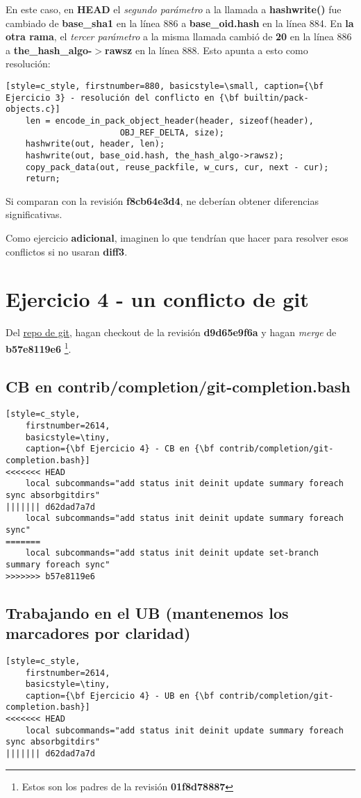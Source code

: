 En este caso, en {\bf HEAD} el {\it segundo parámetro} a la llamada a {\bf hashwrite()} fue cambiado de {\bf base\_sha1} en
la línea 886 a {\bf base\_oid.hash} en la línea 884. En {\bf la otra rama}, el {\it tercer parámetro} a la misma llamada
cambió de {\bf 20} en la línea 886 a {\bf the\_hash\_algo-$>$rawsz} en la línea 888. Esto apunta a esto como resolución:

\begin{lstlisting}[style=c_style, firstnumber=880, basicstyle=\small, caption={\bf Ejercicio 3} - resolución del conflicto en {\bf builtin/pack-objects.c}]
	len = encode_in_pack_object_header(header, sizeof(header),
					   OBJ_REF_DELTA, size);
	hashwrite(out, header, len);
	hashwrite(out, base_oid.hash, the_hash_algo->rawsz);
	copy_pack_data(out, reuse_packfile, w_curs, cur, next - cur);
	return;
\end{lstlisting}

Si comparan con la revisión {\bf f8cb64e3d4}, ne deberían obtener diferencias significativas.

Como ejercicio {\bf adicional},  imaginen lo que tendrían que hacer para resolver esos conflictos si no usaran {\bf diff3}.

\section{Ejercicio 4 - un conflicto de git}
\label{exercise_04}
Del \hyperref[git_repo]{repo de git}, hagan checkout de la revisión {\bf d9d65e9f6a} y hagan {\it merge} de {\bf b57e8119e6}
\footnote{Estos son los padres de la revisión {\bf 01f8d78887}}.

\subsection*{CB en contrib/completion/git-completion.bash}
\begin{lstlisting}[style=c_style,
	firstnumber=2614,
	basicstyle=\tiny,
	caption={\bf Ejercicio 4} - CB en {\bf contrib/completion/git-completion.bash}]
<<<<<<< HEAD
	local subcommands="add status init deinit update summary foreach sync absorbgitdirs"
||||||| d62dad7a7d
	local subcommands="add status init deinit update summary foreach sync"
=======
	local subcommands="add status init deinit update set-branch summary foreach sync"
>>>>>>> b57e8119e6
\end{lstlisting}

\subsection*{Trabajando en el {\bf UB} (mantenemos los marcadores por claridad)}
\begin{lstlisting}[style=c_style,
	firstnumber=2614,
	basicstyle=\tiny,
	caption={\bf Ejercicio 4} - UB en {\bf contrib/completion/git-completion.bash}]
<<<<<<< HEAD
	local subcommands="add status init deinit update summary foreach sync absorbgitdirs"
||||||| d62dad7a7d
\end{lstlisting}

